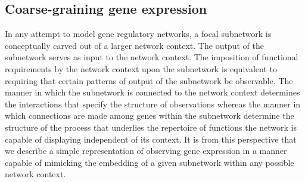 \subsection{Coarse-graining gene expression}
In any attempt to model gene regulatory networks, a focal subnetwork is conceptually carved out of a larger network context. The output of the subnetwork serves as input to the network context. The imposition of functional requirements by the network context upon the subnetwork is equivalent to requiring that certain patterns of output of the subnetwork be observable. The manner in which the subnetwork is connected to the network context determines the interactions that specify the structure of observations whereas the manner in which connections are made among genes within the subnetwork determine the structure of the process that underlies the repertoire of functions the network is capable of displaying independent of its context. It is from this perspective that we describe a simple representation of observing gene expression in a manner capable of mimicking the embedding of a given subnetwork within any possible network context.


